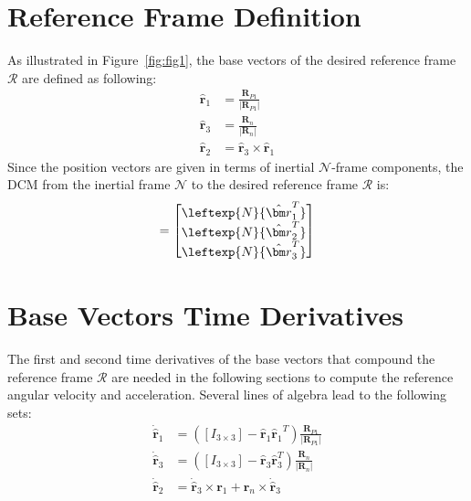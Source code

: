 \documentclass[]{AVSSimReportMemo}
\begin{document}
\section{Reference Frame Definition}
As illustrated in Figure~\ref{fig:fig1}, the base vectors of the desired reference frame $\mathcal{R}$  are defined as following:
\begin{subequations}
	\begin{align}
		\hat{\bm r}_{1} &= \frac{{\bm R}_{P1}} {|{\bm R}_{P1}|} \\
		\hat{\bm r}_{3} &= \frac{{\bm R}_{n}}{|{\bm R}_{n}|} \\
		\hat{\bm r}_{2} &=  \hat{\bm r}_{3} \times \hat{\bm r}_{1}
	\end{align}
\end{subequations}
Since the position vectors are given in terms of inertial $\mathcal{N}$-frame components, the DCM from the inertial frame $\mathcal{N}$ to the desired reference frame $\mathcal{R}$ is:
\begin{equation}
	[RN] = \begin{bmatrix}
		\leftexp{N}{ \hat{\bm r}_{1}^{T} } \\
		\leftexp{N}{ \hat{\bm r}_{2}^{T} }  \\
		\leftexp{N}{ \hat{\bm r}_{3}^{T} }
	\end{bmatrix}
\end{equation}
\section{Base Vectors Time Derivatives}
The first and second time derivatives of the base vectors that compound the reference frame $\mathcal{R}$ are needed in the following sections to compute the reference angular velocity and acceleration. Several lines of algebra lead to the following sets:
\begin{subequations}
	\begin{align}
		\dot{\hat{\bm{r}}}_1 &= ([I_{3\times3}] - {\hat{\bm{r}}_1}{\hat{\bm{r}}_1}^T)  \frac{{\bm R}_{P1}} {|{\bm R}_{P1}|} \\
		\dot{\hat{\bm{r}}}_3 &= ([I_{3\times3}] - \hat{\bm{r}}_3 \hat{\bm{r}}_3^T)  \frac{{\bm R}_{n}} {|{\bm R}_{n}|} \\
		\dot{\hat{\bm{r}}}_2 &= \dot{\hat{\bm{r}}}_3 \times \bm{r}_1 +  \bm{r}_n  \times \dot{\hat{\bm{r}}}_3
	\end{align}
\end{subequations}
\end{document}
